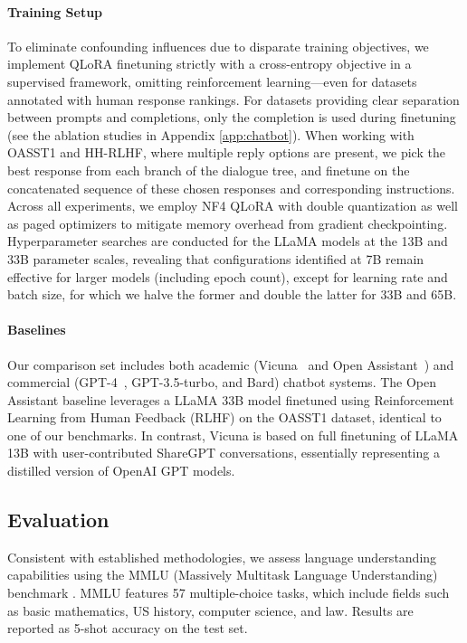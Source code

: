 \paragraph{Training Setup} To eliminate confounding influences due to disparate training objectives, we implement QLoRA finetuning strictly with a cross-entropy objective in a supervised framework, omitting reinforcement learning—even for datasets annotated with human response rankings. For datasets providing clear separation between prompts and completions, only the completion is used during finetuning (see the ablation studies in Appendix \ref{app:chatbot}). When working with OASST1 and HH-RLHF, where multiple reply options are present, we pick the best response from each branch of the dialogue tree, and finetune on the concatenated sequence of these chosen responses and corresponding instructions. Across all experiments, we employ NF4 \textsc{QLoRA} with double quantization as well as paged optimizers to mitigate memory overhead from gradient checkpointing. Hyperparameter searches are conducted for the LLaMA models at the 13B and 33B parameter scales, revealing that configurations identified at 7B remain effective for larger models (including epoch count), except for learning rate and batch size, for which we halve the former and double the latter for 33B and 65B.

\paragraph{Baselines} Our comparison set includes both academic (Vicuna~\citep{vicuna2023} and Open Assistant~\citep{kopf2023openassistant}) and commercial (GPT-4~\citep{openai2023gpt}, GPT-3.5-turbo, and Bard) chatbot systems. The Open Assistant baseline leverages a LLaMA 33B model finetuned using Reinforcement Learning from Human Feedback (RLHF) on the OASST1 dataset, identical to one of our benchmarks. In contrast, Vicuna is based on full finetuning of LLaMA 13B with user-contributed ShareGPT conversations, essentially representing a distilled version of OpenAI GPT models.

\subsection{Evaluation}

Consistent with established methodologies, we assess language understanding capabilities using the MMLU (Massively Multitask Language Understanding) benchmark \citep{hendrycksmeasuring}. MMLU features 57 multiple-choice tasks, which include fields such as basic mathematics, US history, computer science, and law. Results are reported as 5-shot accuracy on the test set.

